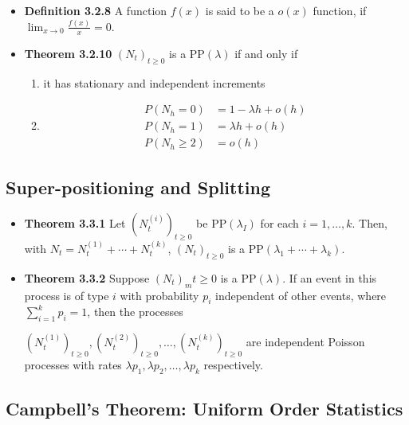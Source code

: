 \documentclass[11pt,a4paper]{article}
\begin{document}
\begin{itemize}
    \item \textbf{Definition 3.2.8}
        A function $f(x)$ is said to be a $o(x)$ function, if
        $\lim_{x \to 0} \frac{f(x)}{x} = 0$.

    \item \textbf{Theorem 3.2.10}
        ${(N_t)}_{t \geq 0}$ is a $\mathrm{PP}(\lambda)$ if and only if
        \begin{enumerate}
            \item it has stationary and independent increments
            \item
                \begin{align*}{}
                    P(N_h = 0)    & = 1 - \lambda h + o(h) \\
                    P(N_h = 1)    & = \lambda h + o(h) \\
                    P(N_h \geq 2) & = o(h)
                \end{align*}
        \end{enumerate}

\end{itemize}

\subsection{Super-positioning and Splitting}

\begin{itemize}
    \item \textbf{Theorem 3.3.1}
        Let ${(N_t^{(i)})}_{t\geq 0}$ be $\mathrm{PP}(\lambda _I)$ for each $i = 1, \ldots, k$.
        Then, with $N_t = N_t^{(1)} + \cdots + N_t^{(k)}$, ${(N_t)}_{t\geq 0}$ is a
        $\mathrm{PP}(\lambda_1 + \cdots + \lambda_k)$.

    \item \textbf{Theorem 3.3.2}
        Suppose ${(N_t)}_m{t \geq 0}$ is a $\mathrm{PP}(\lambda)$.
        If an event in this process is of type $i$ with probability $p_i$
        independent of other events, where $\sum_{i=1}^k p_i = 1$, then the processes

        ${(N_t^{(1)})}_{t\geq 0}, {(N_t^{(2)})}_{t \geq 0}, \ldots, {(N_t^{(k)})}_{t \geq 0}$
        are independent Poisson processes with rates $\lambda p_1, \lambda p_2, \ldots, \lambda p_k$
        respectively.

\end{itemize}

\subsection{Campbell's Theorem: Uniform Order Statistics}
\end{document}
